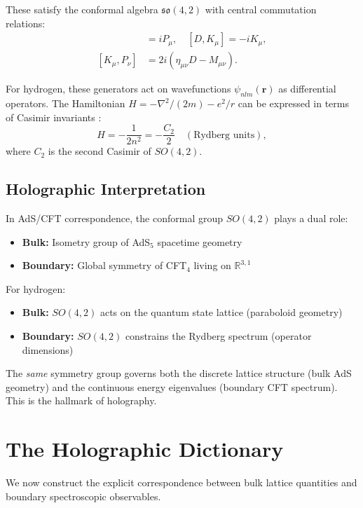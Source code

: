 \documentclass[aps,prd,twocolumn,superscriptaddress,floatfix]{revtex4-2}
\begin{document}
These satisfy the conformal algebra $\mathfrak{so}(4,2)$ with central commutation relations:
\begin{align}
[D, P_\mu] &= iP_\mu, \quad [D, K_\mu] = -iK_\mu, \\
[K_\mu, P_\nu] &= 2i(\eta_{\mu\nu} D - M_{\mu\nu}).
\end{align}

For hydrogen, these generators act on wavefunctions $\psi_{nlm}(\mathbf{r})$ as differential operators. The Hamiltonian $H = -\nabla^2/(2m) - e^2/r$ can be expressed in terms of Casimir invariants \cite{barut1967}:
\begin{equation}
H = -\frac{1}{2n^2} = -\frac{C_2}{2} \quad (\text{Rydberg units}),
\end{equation}
where $C_2$ is the second Casimir of $SO(4,2)$.

\subsection{Holographic Interpretation}

In AdS/CFT correspondence, the conformal group $SO(4,2)$ plays a dual role:
\begin{itemize}
\item \textbf{Bulk:} Isometry group of AdS$_5$ spacetime geometry
\item \textbf{Boundary:} Global symmetry of CFT$_4$ living on $\mathbb{R}^{3,1}$
\end{itemize}

For hydrogen:
\begin{itemize}
\item \textbf{Bulk:} $SO(4,2)$ acts on the quantum state lattice (paraboloid geometry)
\item \textbf{Boundary:} $SO(4,2)$ constrains the Rydberg spectrum (operator dimensions)
\end{itemize}

The \textit{same} symmetry group governs both the discrete lattice structure (bulk AdS geometry) and the continuous energy eigenvalues (boundary CFT spectrum). This is the hallmark of holography.


\section{The Holographic Dictionary}

We now construct the explicit correspondence between bulk lattice quantities and boundary spectroscopic observables.
\end{document}
